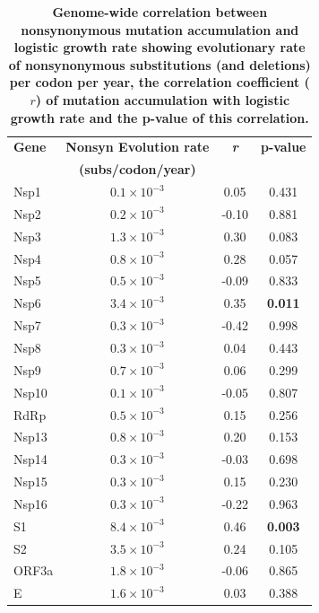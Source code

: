 \documentclass[11pt,oneside,letterpaper]{article}
\begin{document}
\begin{table}[]
    \begin{center}
    \caption{\textbf{Genome-wide correlation between nonsynonymous mutation accumulation and logistic growth rate showing evolutionary rate of nonsynonymous substitutions (and deletions) per codon per year, the correlation coefficient ($r$) of mutation accumulation with logistic growth rate and the p-value of this correlation.}}
    \begin{tabular}{lccc}
    \hline
    \textbf{Gene} & \textbf{Nonsyn Evolution rate} & \textbf{\emph{r}} & \textbf{p-value} \\
      & \textbf{(subs/codon/year)} &  &  \\
    \hline
    Nsp1  & $0.1 \times 10^{-3}$  & 0.05   & 0.431     \\
    Nsp2  & $0.2 \times 10^{-3}$  & -0.10  & 0.881     \\
    Nsp3  & $1.3 \times 10^{-3}$  & 0.30   & 0.083     \\
    Nsp4  & $0.8 \times 10^{-3}$  & 0.28   & 0.057     \\
    Nsp5  & $0.5 \times 10^{-3}$  & -0.09  & 0.833     \\
    Nsp6  & $3.4 \times 10^{-3}$  & 0.35   & \textbf{0.011}     \\
    Nsp7  & $0.3 \times 10^{-3}$  & -0.42  & 0.998     \\
    Nsp8  & $0.3 \times 10^{-3}$  & 0.04   & 0.443     \\
    Nsp9  & $0.7 \times 10^{-3}$  & 0.06   & 0.299     \\
    Nsp10 & $0.1 \times 10^{-3}$  & -0.05  & 0.807     \\
    RdRp  & $0.5 \times 10^{-3}$  & 0.15   & 0.256     \\
    Nsp13 & $0.8 \times 10^{-3}$  & 0.20   & 0.153     \\
    Nsp14 & $0.3 \times 10^{-3}$  & -0.03  & 0.698     \\
    Nsp15 & $0.3 \times 10^{-3}$  & 0.15   & 0.230     \\
    Nsp16 & $0.3 \times 10^{-3}$  & -0.22  & 0.963     \\
    S1    & $8.4 \times 10^{-3}$  & 0.46   & \textbf{0.003}     \\
    S2    & $3.5 \times 10^{-3}$  & 0.24   & 0.105     \\
    ORF3a & $1.8 \times 10^{-3}$  & -0.06  & 0.865     \\
    E     & $1.6 \times 10^{-3}$  & 0.03   & 0.388     \\

\end{tabular}
\end{center}
\end{table}
\end{document}
